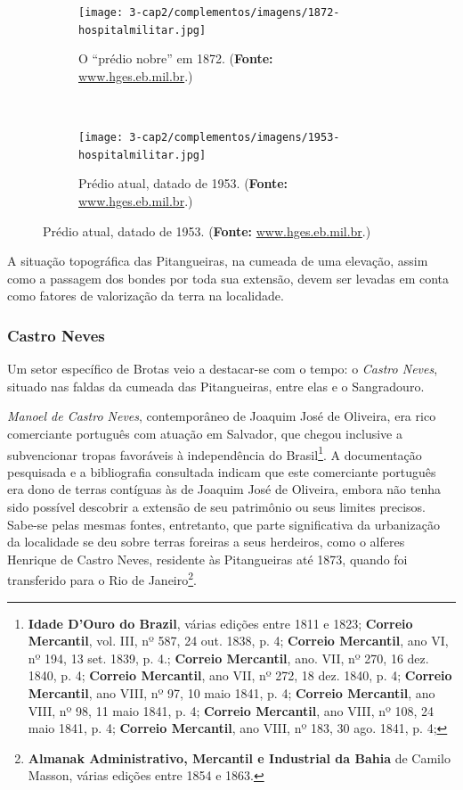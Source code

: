 \begin{figure}[!htp]
	\caption{Hospital Militar de Salvador em dois tempos}
	\centering
		\begin{subfigure}[b]{\textwidth}
			\texttt{[image: 3-cap2/complementos/imagens/1872-hospitalmilitar.jpg]}
			\caption{\footnotesize O ``prédio nobre'' em 1872. (\textbf{Fonte:} \url{www.hges.eb.mil.br}.) }
			\label{fig:hospmil1872}
		\end{subfigure}
\  %
		\begin{subfigure}[b]{\textwidth}
			\texttt{[image: 3-cap2/complementos/imagens/1953-hospitalmilitar.jpg]} 
			\caption{\footnotesize Prédio atual, datado de 1953. (\textbf{Fonte:} \url{www.hges.eb.mil.br}.) }
			\label{fig:hospmil1953}
		\end{subfigure}
	\label{fig:hospmil}
\end{figure}

A situação topográfica das Pitangueiras, na cumeada de uma elevação, assim como a passagem dos bondes por toda sua extensão, devem ser levadas em conta como fatores de valorização da terra na localidade.

\subsubsection{Castro Neves}\label{subsubsec:castroneves}

Um setor específico de Brotas veio a destacar-se com o tempo: o \textit{Castro Neves}, situado nas faldas da cumeada das Pitangueiras, entre elas e o Sangradouro.

\textit{Manoel de Castro Neves}, contemporâneo de Joaquim José de Oliveira, era rico comerciante português com atuação em Salvador, que chegou inclusive a subvencionar tropas favoráveis à independência do Brasil\footnote{\textbf{Idade D'Ouro do Brazil}, várias edições entre 1811 e 1823; \textbf{Correio Mercantil}, vol. III, nº 587, 24 out. 1838, p. 4; \textbf{Correio Mercantil}, ano VI, nº 194, 13 set. 1839, p. 4.; \textbf{Correio Mercantil}, ano. VII, nº 270, 16 dez. 1840, p. 4; \textbf{Correio Mercantil}, ano VII, nº 272, 18 dez. 1840, p. 4; \textbf{Correio Mercantil}, ano VIII, nº 97, 10 maio 1841, p. 4; \textbf{Correio Mercantil}, ano VIII, nº 98, 11 maio 1841, p. 4;  \textbf{Correio Mercantil}, ano VIII, nº 108, 24 maio 1841, p. 4; \textbf{Correio Mercantil}, ano VIII, nº 183, 30 ago. 1841, p. 4;}. A documentação pesquisada e a bibliografia consultada indicam que este comerciante português era dono de terras contíguas às de Joaquim José de Oliveira, embora não tenha sido possível descobrir a extensão de seu patrimônio ou seus limites precisos. Sabe-se pelas mesmas fontes, entretanto, que parte significativa da urbanização da localidade se deu sobre terras foreiras a seus herdeiros, como o alferes Henrique de Castro Neves, residente às Pitangueiras até 1873, quando foi transferido para o Rio de Janeiro\footnote{\textbf{Almanak Administrativo, Mercantil e Industrial da Bahia} de Camilo Masson, várias edições entre 1854 e 1863.}. 

